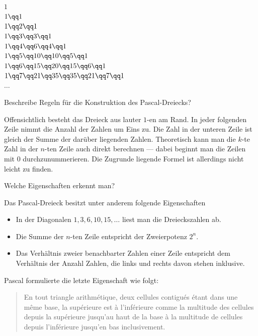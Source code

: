 \documentclass[%
11pt,%
twoside,%
titlepage,%
german,%
]{scrartcl}
\begin{document}
  \begin{center}
    \ \\[2pt]
    $1$\\[6pt]
    $1\qq1$\\[6pt]
    $1\qq2\qq1$\\[6pt]
    $1\qq3\qq3\qq1$\\[6pt]
    $1\qq4\qq6\qq4\qq1$\\[6pt]
    $1\qq5\qq10\qq10\qq5\qq1$\\[6pt]
    $1\qq6\qq15\qq20\qq15\qq6\qq1$\\[6pt]
    $1\qq7\qq21\qq35\qq35\qq21\qq7\qq1$\\[6pt]
    $\dots$
  \end{center}

\begin{frage}
Beschreibe Regeln f\"ur die Konstruktion des Pascal-Dreiecks?
\end{frage}
Offensichtlich besteht das Dreieck aus lauter $1$-en am Rand. In jeder folgenden Zeile nimmt die Anzahl der Zahlen um Eins zu. Die Zahl in der unteren Zeile ist gleich der Summe der dar\"uber liegenden Zahlen. Theoretisch kann man die $k$-te Zahl in der $n$-ten Zeile auch direkt berechnen  --- dabei beginnt man die Zeilen mit $0$ durchzunummerieren. Die Zugrunde liegende Formel ist allerdings nicht leicht zu finden.

\begin{frage}
Welche Eigenschaften erkennt man?
\end{frage}

Das Pascal-Dreieck besitzt unter anderem folgende Eigenschaften
\begin{itemize}
\item In der Diagonalen $1,3,6,10,15,\dots$ liest man die Dreieckszahlen ab.
\item Die Summe der $n$-ten Zeile entspricht der Zweierpotenz $2^{n}$.
\item Das Verh\"altnis zweier benachbarter Zahlen einer Zeile entspricht dem Verh\"altnis der Anzahl Zahlen, die links und rechts davon stehen inklusive.
\end{itemize}

\noindent Pascal formulierte die letzte Eigenschaft wie folgt:
\begin{quote}
  \glqq En tout triangle arithmétique, deux cellules contigués étant dans
  une même base, la supérieure est à l'inférieure comme la multitude
  des cellules depuis la supérieure jusqu'au haut de la base à la
  multitude de cellules depuis l'inférieure jusqu'en bas
  inclusivement.\grqq
\end{quote}
\end{document}
